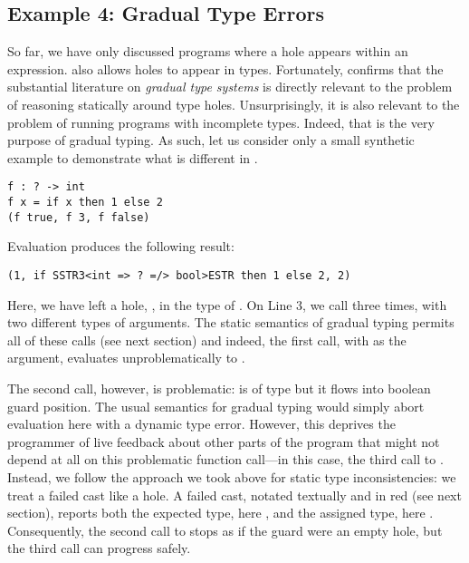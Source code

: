 
\vspace{-4px}
\subsection{Example 4: Gradual Type Errors}
\vspace{-2px}
So far, we have only discussed programs where a hole appears within an expression.
\Hazel also allows holes to appear in types.
Fortunately, \citet{popl-paper} confirms that the substantial literature on \emph{gradual type systems} \cite{Siek06a,DBLP:conf/snapl/SiekVCB15} is directly relevant to the problem of reasoning statically around type holes.
Unsurprisingly, it is also relevant to the problem of running 
programs with incomplete types. Indeed, that is the very purpose of gradual typing. As such, let us consider only a small synthetic example to demonstrate what is different in \Hazel.
\begin{lstlisting}
f : ? -> int
f x = if x then 1 else 2
(f true, f 3, f false)
\end{lstlisting}
Evaluation produces the following result:
\begin{lstlisting}[numbers=none]
(1, if SSTR3<int => ? =/> bool>ESTR then 1 else 2, 2)
\end{lstlisting}
Here, we have left a hole, , in the type of . On Line 3, we call  three times, with two different types of arguments. The static semantics of gradual typing permits all of these calls (see next section) and indeed, the first call, with  as the argument, evaluates unproblematically to . 

The second call, however, is problematic:  is of type  but it flows into boolean guard position. The usual semantics for gradual typing would simply abort evaluation here with a dynamic type error. However, this deprives the programmer of live feedback about other parts of the program that might not depend at all on this problematic function call---in this case, the third call to . Instead, we follow the approach we took above for static type inconsistencies: we treat a failed cast like a hole. A failed cast, notated textually and in red  (see next section), reports both the expected type, here , and the assigned type, here . Consequently, the second call to  stops as if the guard were an empty hole, but the third call can progress safely.

